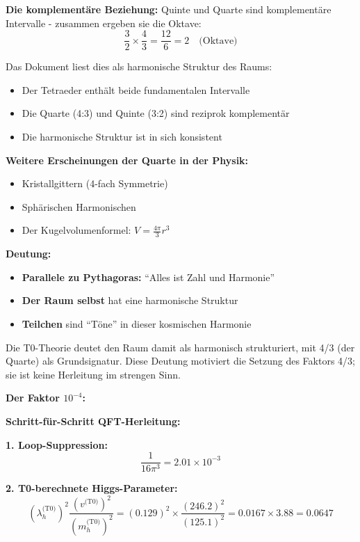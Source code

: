 \textbf{Die komplementäre Beziehung:}
Quinte und Quarte sind komplementäre Intervalle - zusammen ergeben sie die Oktave:
\begin{equation}
	\frac{3}{2} \times \frac{4}{3} = \frac{12}{6} = 2 \quad \text{(Oktave)}
\end{equation}

Das Dokument liest dies als harmonische Struktur des Raums:
\begin{itemize}
	\item Der Tetraeder enthält beide fundamentalen Intervalle
	\item Die Quarte (4:3) und Quinte (3:2) sind reziprok komplementär
	\item Die harmonische Struktur ist in sich konsistent
\end{itemize}

\textbf{Weitere Erscheinungen der Quarte in der Physik:}
\begin{itemize}
	\item Kristallgittern (4-fach Symmetrie)
	\item Sphärischen Harmonischen
	\item Der Kugelvolumenformel: $V = \frac{4\pi}{3}r^3$
\end{itemize}

\textbf{Deutung:}
\begin{itemize}
	\item \textbf{Parallele zu Pythagoras:} ``Alles ist Zahl und Harmonie''
	\item \textbf{Der Raum selbst} hat eine harmonische Struktur
	\item \textbf{Teilchen} sind ``Töne'' in dieser kosmischen Harmonie
\end{itemize}

Die T0-Theorie deutet den Raum damit als harmonisch strukturiert, mit 4/3 (der Quarte) als Grundsignatur. Diese Deutung motiviert die Setzung des Faktors 4/3; sie ist keine Herleitung im strengen Sinn.

\textbf{Der Faktor $10^{-4}$:}

\textbf{Schritt-für-Schritt QFT-Herleitung:}

\textbf{1. Loop-Suppression:}
\begin{equation}
	\frac{1}{16\pi^3} = 2.01 \times 10^{-3}
\end{equation}

\textbf{2. T0-berechnete Higgs-Parameter:}
\begin{equation}
	(\lambda_h^{\text{(T0)}})^2 \frac{(v^{\text{(T0)}})^2}{(m_h^{\text{(T0)}})^2} = (0.129)^2 \times \frac{(246.2)^2}{(125.1)^2} = 0.0167 \times 3.88 = 0.0647
\end{equation}

